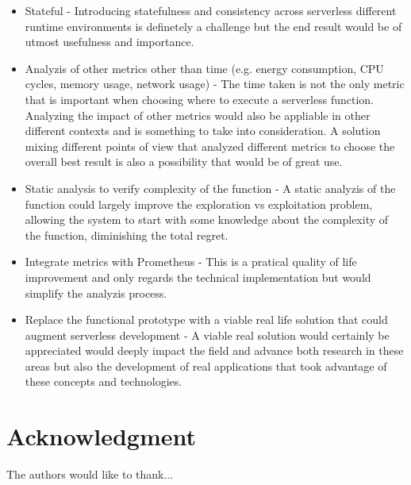 \documentclass[conference]{IEEEtran}
\begin{document}
\begin{itemize}
    \item Stateful - Introducing statefulness and consistency across serverless
        different runtime environments is definetely a challenge but the end
        result would be of utmost usefulness and importance.
    \item Analyzis of other metrics other than time (e.g. energy consumption, CPU
        cycles, memory usage, network usage) - The time taken is not the only
        metric that is important when choosing where to execute a serverless
        function. Analyzing the impact of other metrics would also be appliable
        in other different contexts and is something to take into consideration.
        A solution mixing different points of view that analyzed different metrics
        to choose the overall best result is also a possibility that would be of
        great use.
    \item Static analysis to verify complexity of the function - A static analyzis
        of the function could largely improve the exploration vs exploitation
        problem, allowing the system to start with some knowledge about the
        complexity of the function, diminishing the total regret.
    \item Integrate metrics with Prometheus - This is a pratical quality of life
        improvement and only regards the technical implementation but would
        simplify the analyzis process.
    \item Replace the functional prototype with a viable real life solution that
        could augment serverless development - A viable real solution would
        certainly be appreciated would deeply impact the field and advance
        both research in these areas but also the development of real applications
        that took advantage of these concepts and technologies.
\end{itemize}









\section*{Acknowledgment}


The authors would like to thank...
\end{document}
